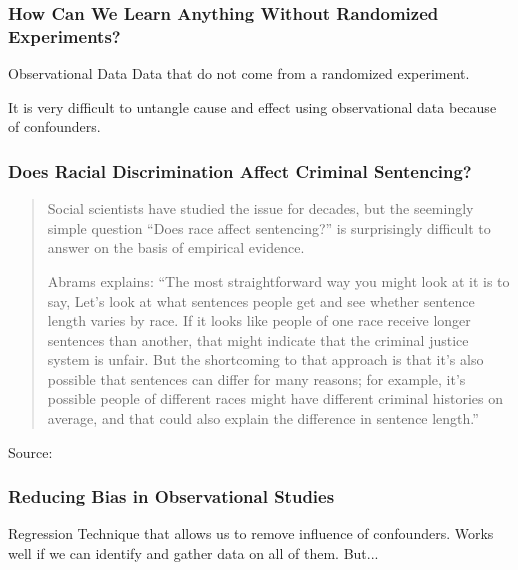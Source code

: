 \documentclass[handout]{beamer}
\begin{document}
\begin{frame}
\frametitle{How Can We Learn Anything Without Randomized Experiments?}
	\begin{block}{Observational Data}
		Data that do not come from a randomized experiment.	
	\end{block}
	\vspace{2em}
	\begin{alertblock}{It is very difficult to untangle cause and effect using observational data because of confounders.}
	\end{alertblock}
\end{frame}

\begin{frame}
\frametitle{Does Racial Discrimination  Affect Criminal Sentencing?}
	\begin{quote}
	\footnotesize
		Social scientists have studied the issue for decades, but the seemingly simple question ``Does race affect sentencing?'' is surprisingly difficult to answer on the basis of empirical evidence.
		
		Abrams explains: \alert{``The most straightforward way you might look at it is to say, Let’s look at what sentences people get and see whether sentence length varies by race. If it looks like people of one race receive longer sentences than another, that might indicate that the criminal justice system is unfair. But the shortcoming to that approach is that it’s also possible that sentences can differ for many reasons; for example, it’s possible people of different races might have different criminal histories on average, and that could also explain the difference in sentence length.''}
	\end{quote}
	\tiny{Source: \href{https://www.law.upenn.edu/live/news/2170-new-study-by-professor-david-s-abrams-confirms}{}}
\end{frame}

\begin{frame}
\frametitle{Reducing Bias in Observational Studies}
	\begin{block}{Regression}
	Technique that allows us to remove influence of confounders. Works well if we can identify and gather data on all of them. But...
	\end{block}
\end{frame}
\end{document}
